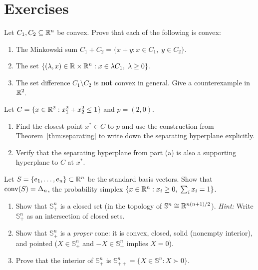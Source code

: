 \documentclass[11pt,a4paper]{article}
\begin{document}
\section{Exercises}

\begin{exercise}
\label{exer:set-operations}
Let $C_1, C_2 \subseteq \mathbb{R}^n$ be convex.  Prove that each of the following is
convex:
\begin{enumerate}[label=(\alph*)]
  \item The Minkowski sum $C_1 + C_2 = \{x + y : x \in C_1,\; y \in C_2\}$.
  \item The set $\{(\lambda, x) \in \mathbb{R} \times \mathbb{R}^n : x \in \lambda C_1,\;
        \lambda \ge 0\}$.
  \item The set difference $C_1 \setminus C_2$ is \textbf{not} convex in
        general.  Give a counterexample in $\mathbb{R}^2$.
\end{enumerate}
\end{exercise}

\begin{exercise}
\label{exer:separation-disk}
Let $C = \{x \in \mathbb{R}^2 : x_1^2 + x_2^2 \le 1\}$ and $p = (2, 0)$.
\begin{enumerate}[label=(\alph*)]
  \item Find the closest point $x^* \in C$ to $p$ and use the construction
        from Theorem~\ref{thm:separating} to write down the separating
        hyperplane explicitly.
  \item Verify that the separating hyperplane from part (a) is also a
        supporting hyperplane to $C$ at $x^*$.
\end{enumerate}
\end{exercise}

\begin{exercise}
\label{exer:convex-hull-finite}
Let $S = \{e_1, \ldots, e_n\} \subset \mathbb{R}^n$ be the standard basis vectors.
Show that $\operatorname{conv}(S) = \Delta_n$, the probability simplex
$\{x \in \mathbb{R}^n : x_i \ge 0,\; \sum_i x_i = 1\}$.
\end{exercise}

\begin{exercise}
\label{exer:psd-cone}
\begin{enumerate}[label=(\alph*)]
  \item Show that $\mathbb{S}^n_+$ is a closed set (in the topology of
        $\mathbb{S}^n \cong \mathbb{R}^{n(n+1)/2}$).
        \textit{Hint:} Write $\mathbb{S}^n_+$ as an intersection of closed
        sets.
  \item Show that $\mathbb{S}^n_+$ is a \emph{proper} cone: it is convex,
        closed, solid (nonempty interior), and pointed ($X \in
        \mathbb{S}^n_+$ and $-X \in \mathbb{S}^n_+$ implies $X = 0$).
  \item Prove that the interior of $\mathbb{S}^n_+$ is
        $\mathbb{S}^n_{++} = \{X \in \mathbb{S}^n : X \succ 0\}$.
\end{enumerate}
\end{exercise}
\end{document}
